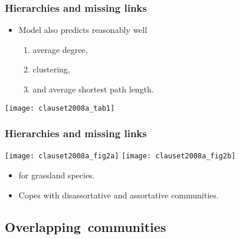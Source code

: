 \begin{frame}
  \frametitle{Hierarchies and missing links}

  \begin{itemize}
  \item<1->
    Model also predicts reasonably well
    \begin{enumerate}
    \item 
      average degree,
    \item 
      clustering, 
    \item 
      and average shortest path length.
    \end{enumerate}
  \end{itemize}

  \texttt{[image: clauset2008a\_tab1]}

\end{frame}

\begin{frame}
  \frametitle{Hierarchies and missing links}

  \texttt{[image: clauset2008a\_fig2a]}
  \texttt{[image: clauset2008a\_fig2b]}

  \begin{itemize}
  \item<1->
     for grassland species.
  \item<2->
    Copes with disassortative and assortative communities.
  \end{itemize}

\end{frame}

\subsection{Overlapping\ communities}

